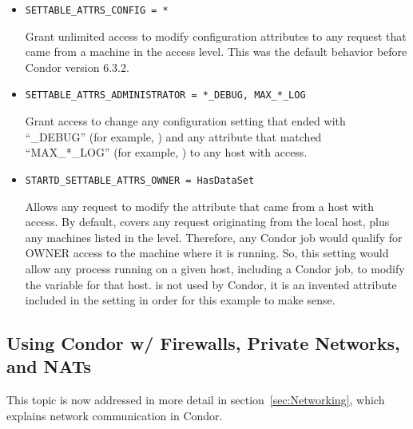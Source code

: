 \begin{itemize}

\item \begin{verbatim}SETTABLE_ATTRS_CONFIG = *\end{verbatim}
Grant unlimited access to modify configuration attributes
to any request that came from a machine in the  access
level. 
This was the default behavior before Condor version 6.3.2.

\item \begin{verbatim}SETTABLE_ATTRS_ADMINISTRATOR = *_DEBUG, MAX_*_LOG\end{verbatim} 
Grant access to change any configuration setting that ended
with ``\_DEBUG'' (for example, ) and any
attribute that matched ``MAX\_*\_LOG'' (for example,
) to any host with 
access. 

\item \begin{verbatim}STARTD_SETTABLE_ATTRS_OWNER = HasDataSet\end{verbatim}
Allows any request to modify the  
attribute that came from a host with  access.
By default,  covers any request originating from the
local host, plus any machines listed in the 
level.
Therefore, any Condor job would qualify for OWNER access to the
machine where it is running. 
So, this setting would allow any process running on a given host,
including a Condor job, to modify the  variable for
that host. 
 is not used by Condor, it is an invented attribute
included in the  setting in order for this
example to make sense.

\end{itemize}

\subsection{\label{sec:security-networks}Using 
Condor w/ Firewalls, Private Networks, and NATs}

This topic is now addressed in more detail in
section~\ref{sec:Networking}, which explains network communication in
Condor.

